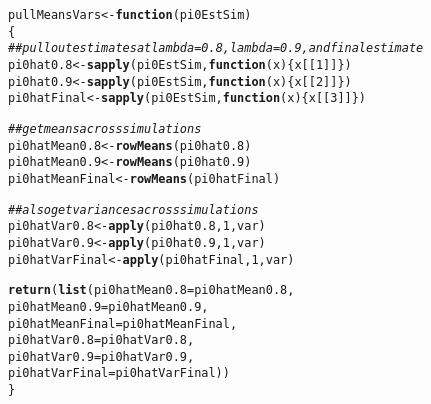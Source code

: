 \documentclass{article}\usepackage[]{graphicx}\usepackage[]{color}
\makeatletter
\newcommand{\hlnum}[1]{\textcolor[rgb]{0.686,0.059,0.569}{#1}}%
\newcommand{\hlcom}[1]{\textcolor[rgb]{0.678,0.584,0.686}{\textit{#1}}}%
\newcommand{\hlstd}[1]{\textcolor[rgb]{0.345,0.345,0.345}{#1}}%
\newcommand{\hlkwa}[1]{\textcolor[rgb]{0.161,0.373,0.58}{\textbf{#1}}}%
\newcommand{\hlkwb}[1]{\textcolor[rgb]{0.69,0.353,0.396}{#1}}%
\newcommand{\hlkwc}[1]{\textcolor[rgb]{0.333,0.667,0.333}{#1}}%
\newcommand{\hlkwd}[1]{\textcolor[rgb]{0.737,0.353,0.396}{\textbf{#1}}}%
\newenvironment{kframe}{%
 \def\at@end@of@kframe{}%
 \ifinner\ifhmode%
  \def\at@end@of@kframe{\end{minipage}}%
  \begin{minipage}{\columnwidth}%
 \fi\fi%
 \def\FrameCommand##1{\hskip\@totalleftmargin \hskip-\fboxsep
 \colorbox{shadecolor}{##1}\hskip-\fboxsep
     \hskip-\linewidth \hskip-\@totalleftmargin \hskip\columnwidth}%
 \MakeFramed {\advance\hsize-\width
   \@totalleftmargin\z@ \linewidth\hsize
   \@setminipage}}%
 {\par\unskip\endMakeFramed%
 \at@end@of@kframe}
\newenvironment{knitrout}{}{} %
\makeatother
\begin{document}
\begin{knitrout}
\color{fgcolor}\begin{kframe}
\begin{alltt}
\hlstd{pullMeansVars} \hlkwb{<-} \hlkwa{function}\hlstd{(}\hlkwc{pi0EstSim}\hlstd{)}
\hlstd{\{}
  \hlcom{##pull out estimates at lambda=0.8, lambda=0.9, and final estimate}
  \hlstd{pi0hat0.8} \hlkwb{<-} \hlkwd{sapply}\hlstd{(pi0EstSim,} \hlkwa{function}\hlstd{(}\hlkwc{x}\hlstd{)\{x[[}\hlnum{1}\hlstd{]]\})}
  \hlstd{pi0hat0.9} \hlkwb{<-} \hlkwd{sapply}\hlstd{(pi0EstSim,} \hlkwa{function}\hlstd{(}\hlkwc{x}\hlstd{)\{x[[}\hlnum{2}\hlstd{]]\})}
  \hlstd{pi0hatFinal} \hlkwb{<-} \hlkwd{sapply}\hlstd{(pi0EstSim,} \hlkwa{function}\hlstd{(}\hlkwc{x}\hlstd{)\{x[[}\hlnum{3}\hlstd{]]\})}

  \hlcom{##get means across simulations}
  \hlstd{pi0hatMean0.8} \hlkwb{<-} \hlkwd{rowMeans}\hlstd{(pi0hat0.8)}
  \hlstd{pi0hatMean0.9} \hlkwb{<-} \hlkwd{rowMeans}\hlstd{(pi0hat0.9)}
  \hlstd{pi0hatMeanFinal} \hlkwb{<-} \hlkwd{rowMeans}\hlstd{(pi0hatFinal)}

  \hlcom{##also get variances across simulations}
  \hlstd{pi0hatVar0.8} \hlkwb{<-} \hlkwd{apply}\hlstd{(pi0hat0.8,}\hlnum{1}\hlstd{,var)}
  \hlstd{pi0hatVar0.9} \hlkwb{<-} \hlkwd{apply}\hlstd{(pi0hat0.9,}\hlnum{1}\hlstd{,var)}
  \hlstd{pi0hatVarFinal} \hlkwb{<-} \hlkwd{apply}\hlstd{(pi0hatFinal,}\hlnum{1}\hlstd{,var)}

  \hlkwd{return}\hlstd{(}\hlkwd{list}\hlstd{(}\hlkwc{pi0hatMean0.8}\hlstd{=pi0hatMean0.8,}
              \hlkwc{pi0hatMean0.9}\hlstd{=pi0hatMean0.9,}
              \hlkwc{pi0hatMeanFinal}\hlstd{=pi0hatMeanFinal,}
              \hlkwc{pi0hatVar0.8}\hlstd{=pi0hatVar0.8,}
              \hlkwc{pi0hatVar0.9}\hlstd{=pi0hatVar0.9,}
              \hlkwc{pi0hatVarFinal}\hlstd{=pi0hatVarFinal))}
\hlstd{\}}
\end{alltt}
\end{kframe}
\end{knitrout}
\end{document}
